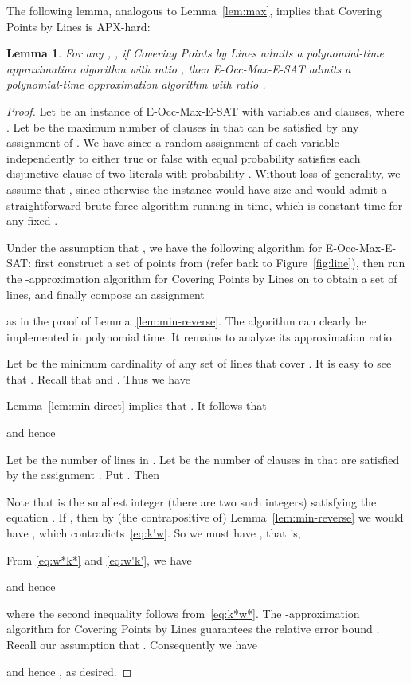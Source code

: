 \documentclass[letterpaper,11pt]{article}
\newtheorem{lemma}{Lemma}
\begin{document}
The following lemma, analogous to Lemma~\ref{lem:max},
implies that {\sc Covering Points by Lines} is APX-hard:

\begin{lemma}\label{lem:min}
For any , ,
if {\sc Covering Points by Lines} admits a polynomial-time approximation algorithm
with ratio ,
then {\sc E-Occ-Max-E-SAT} admits a polynomial-time approximation algorithm
with ratio .
\end{lemma}

\begin{proof}
Let  be an instance of {\sc E-Occ-Max-E-SAT} with  variables
and  clauses, where .
Let  be the maximum number of clauses in  that can be satisfied by
any assignment of .
We have 
since a random assignment of each variable independently to either true
or false with equal probability  satisfies each disjunctive clause
of two literals with probability .
Without loss of generality, we assume that ,
since otherwise the instance  would have size 
and would admit a straightforward brute-force algorithm
running in  time,
which is constant time for any fixed .

Under the assumption that ,
we have the following algorithm for {\sc E-Occ-Max-E-SAT}:
first construct a set  of points from 
(refer back to Figure~\ref{fig:line}),
then run the -approximation algorithm for {\sc Covering Points by Lines} on 
to obtain a set  of lines,
and finally compose an assignment

as in the proof of Lemma~\ref{lem:min-reverse}.
The algorithm can clearly be implemented in polynomial time.
It remains to analyze its approximation ratio.

Let  be the minimum cardinality of any set of lines that cover .
It is easy to see that .
Recall that  and .
Thus we have

Lemma~\ref{lem:min-direct} implies that
.
It follows that

and hence


Let  be the number of lines in .
Let  be the number of clauses in  that are satisfied by the
assignment .
Put .
Then

Note that
 is the smallest integer (there are two such integers)
satisfying the equation
.
If , then by (the contrapositive of) Lemma~\ref{lem:min-reverse}
we would have
,
which contradicts~\eqref{eq:k'w}.
So we must have , that is,

From \eqref{eq:w*k*} and \eqref{eq:w'k'}, we have

and hence

where the second inequality follows from~\eqref{eq:k*w*}.
The -approximation algorithm for {\sc Covering Points by Lines}
guarantees the relative error bound
.
Recall our assumption that
.
Consequently we have

and hence , as desired.
\end{proof}
\end{document}
